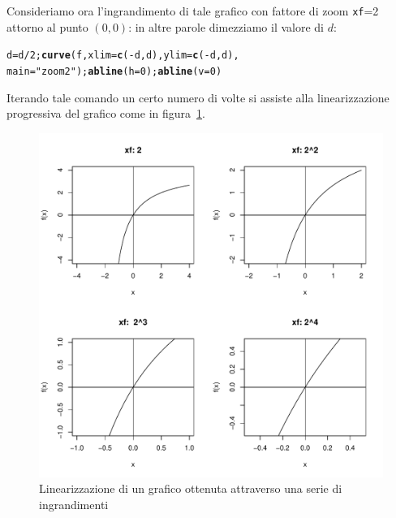 \documentclass[onecolumn,11pt]{book}\usepackage[]{graphicx}\usepackage[]{color}
\makeatletter
\def\maxwidth{ %
  \ifdim\Gin@nat@width>\linewidth
    \linewidth
  \else
    \Gin@nat@width
  \fi
}
\newcommand{\hlnum}[1]{\textcolor[rgb]{0.686,0.059,0.569}{#1}}%
\newcommand{\hlstr}[1]{\textcolor[rgb]{0.192,0.494,0.8}{#1}}%
\newcommand{\hlopt}[1]{\textcolor[rgb]{0,0,0}{#1}}%
\newcommand{\hlstd}[1]{\textcolor[rgb]{0.345,0.345,0.345}{#1}}%
\newcommand{\hlkwb}[1]{\textcolor[rgb]{0.69,0.353,0.396}{#1}}%
\newcommand{\hlkwc}[1]{\textcolor[rgb]{0.333,0.667,0.333}{#1}}%
\newcommand{\hlkwd}[1]{\textcolor[rgb]{0.737,0.353,0.396}{\textbf{#1}}}%
\newenvironment{kframe}{%
 \def\at@end@of@kframe{}%
 \ifinner\ifhmode%
  \def\at@end@of@kframe{\end{minipage}}%
  \begin{minipage}{\columnwidth}%
 \fi\fi%
 \def\FrameCommand##1{\hskip\@totalleftmargin \hskip-\fboxsep
 \colorbox{shadecolor}{##1}\hskip-\fboxsep
     \hskip-\linewidth \hskip-\@totalleftmargin \hskip\columnwidth}%
 \MakeFramed {\advance\hsize-\width
   \@totalleftmargin\z@ \linewidth\hsize
   \@setminipage}}%
 {\par\unskip\endMakeFramed%
 \at@end@of@kframe}
\newenvironment{knitrout}{}{} %
\makeatother
\begin{document}
Consideriamo ora l'ingrandimento di tale grafico con fattore di zoom \texttt{xf}=2 attorno al punto $(0,0)$: in altre parole dimezziamo il valore di $d$:
\begin{knitrout}
\color{fgcolor}\begin{kframe}
\begin{alltt}
\hlstd{d}\hlkwb{=}\hlstd{d}\hlopt{/}\hlnum{2}\hlstd{;}\hlkwd{curve}\hlstd{(f,}\hlkwc{xlim}\hlstd{=}\hlkwd{c}\hlstd{(}\hlopt{-}\hlstd{d,d),}\hlkwc{ylim}\hlstd{=}\hlkwd{c}\hlstd{(}\hlopt{-}\hlstd{d,d),}
\hlkwc{main}\hlstd{=}\hlstr{"zoom 2"}\hlstd{);} \hlkwd{abline}\hlstd{(}\hlkwc{h}\hlstd{=}\hlnum{0}\hlstd{);}\hlkwd{abline}\hlstd{(}\hlkwc{v}\hlstd{=}\hlnum{0}\hlstd{)}
\end{alltt}
\end{kframe}
\end{knitrout}
Iterando tale comando un certo numero di volte si assiste alla linearizzazione progressiva del grafico come in figura~\ref{fig:lin3}.
\begin{center}
\begin{figure}
\begin{knitrout}
\color{fgcolor}
\includegraphics[width=\maxwidth]{figure/unnamed-chunk-111-1} 

\end{knitrout}
\caption{Linearizzazione di un grafico ottenuta attraverso una serie di ingrandimenti}
\label{fig:lin3}
\end{figure}
\end{center}
\end{document}
